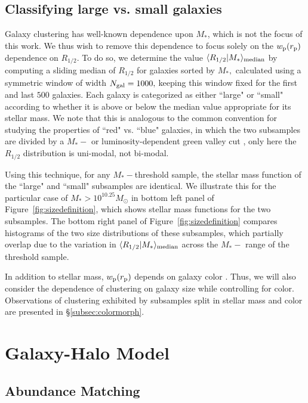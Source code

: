 \documentclass[usenatbib,usegraphicx,letterpaper]{mn2e}
\newcommand{\rhalf}{R_{1/2}}
\newcommand{\mstar}{M_{\ast}}
\newcommand{\rproj}{r_{\rm p}}
\newcommand{\wproj}{w_{\rm p}}
\newcommand{\median}[2]{\langle{#1}\vert{#2}\rangle_{\rm median}}
\newcommand{\msun}{M_\odot}
\begin{document}
\subsection{Classifying large vs. small galaxies}
\label{subsec:sizedef}

Galaxy clustering has well-known dependence upon $\mstar$, which is not the focus of this work.  We thus wish to remove this dependence to focus solely on the  $\wproj(\rproj)$ dependence
on $\rhalf.$ To do so, we determine the value $\median{\rhalf}{\mstar}$ by computing a sliding median of $\rhalf$ for galaxies sorted by $\mstar,$ calculated using a symmetric window of width $N_{\rm gal}=1000,$ keeping this window fixed for the first and last $500$ galaxies. Each galaxy is categorized as either ``large" or ``small" according to whether it is above or below the median value appropriate for its stellar mass. We note that this is analogous to the common convention for studying the properties of ``red" vs. ``blue" galaxies, in which the two subsamples are divided by a $\mstar-$ or luminosity-dependent green valley cut \citep[e.g.,][]{vdB_etal08,zehavi_etal11}, only here the $\rhalf$ distribution is uni-modal, not bi-modal.

Using this technique, for any $\mstar-$threshold sample, the stellar mass function of the ``large" and ``small" subsamples are identical. We illustrate this for the particular case of $\mstar>10^{10.25}\msun$ in bottom left panel of Figure~\ref{fig:sizedefinition}, which shows stellar mass functions for the two subsamples. The bottom right panel of Figure~\ref{fig:sizedefinition} compares histograms of the two size distributions of these subsamples, which partially overlap due to the variation in $\median{\rhalf}{\mstar}$ across the $\mstar-$ range of the threshold sample.

In addition to stellar mass, $\wproj(\rproj)$ depends on galaxy color \citep[e.g.,][]{zehavi_etal11}. Thus, we will also consider the 
dependence of clustering on galaxy size while controlling for color. Observations of clustering exhibited by subsamples split in stellar mass and color are presented in \S\ref{subsec:colormorph}.

\section{Galaxy-Halo Model}
\label{sec:model}

\subsection{Abundance Matching}
\label{subsec:sham}
\end{document}
